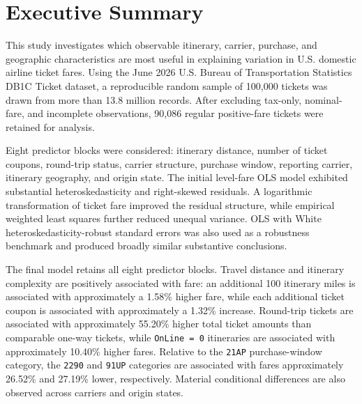 \documentclass[11pt,a4paper]{article}
\begin{document}
\tableofcontents

\clearpage
\setcounter{page}{1}
\pagestyle{main}


\clearpage
\setcounter{page}{1}
\pagestyle{main}

\section*{Executive Summary}

This study investigates which observable itinerary, carrier, purchase, and geographic characteristics are most useful in explaining variation in U.S. domestic airline ticket fares. Using the June 2026 U.S. Bureau of Transportation Statistics DB1C Ticket dataset, a reproducible random sample of 100,000 tickets was drawn from more than 13.8 million records. After excluding tax-only, nominal-fare, and incomplete observations, 90,086 regular positive-fare tickets were retained for analysis.

Eight predictor blocks were considered: itinerary distance, number of ticket coupons, round-trip status, carrier structure, purchase window, reporting carrier, itinerary geography, and origin state. The initial level-fare OLS model exhibited substantial heteroskedasticity and right-skewed residuals. A logarithmic transformation of ticket fare improved the residual structure, while empirical weighted least squares further reduced unequal variance. OLS with White heteroskedasticity-robust standard errors was also used as a robustness benchmark and produced broadly similar substantive conclusions.

The final model retains all eight predictor blocks. Travel distance and itinerary complexity are positively associated with fare: an additional 100 itinerary miles is associated with approximately a 1.58\% higher fare, while each additional ticket coupon is associated with approximately a 1.32\% increase. Round-trip tickets are associated with approximately 55.20\% higher total ticket amounts than comparable one-way tickets, while \texttt{OnLine = 0} itineraries are associated with approximately 10.40\% higher fares. Relative to the \texttt{21AP} purchase-window category, the \texttt{2290} and \texttt{91UP} categories are associated with fares approximately 26.52\% and 27.19\% lower, respectively. Material conditional differences are also observed across carriers and origin states.
\end{document}
